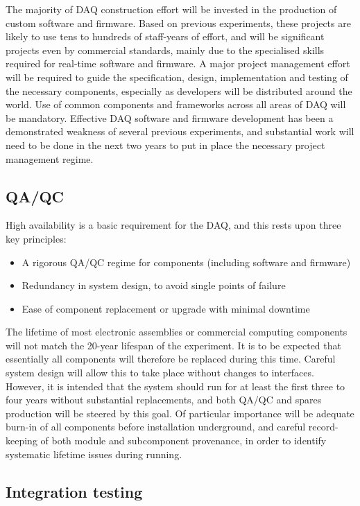 The majority of DAQ construction effort will be invested in the production of custom software and firmware. Based on previous experiments, these projects are likely to use tens to hundreds of staff-years of effort, and will be significant projects even by commercial standards, mainly due to the specialised skills required for real-time software and firmware. A major project management effort will be required to guide the specification, design, implementation and testing of the necessary components, especially as developers will be distributed around the world. Use of common components and frameworks across all areas of DAQ will be mandatory. Effective DAQ software and firmware development has been a demonstrated weakness of several previous experiments, and substantial work will need to be done in the next two years to put in place the necessary project management regime.

\subsection{QA/QC}

High availability is a basic requirement for the DAQ, and this rests upon three key principles:

\begin{itemize}
	\item A rigorous QA/QC regime for components (including software and firmware)
	\item Redundancy in system design, to avoid single points of failure
	\item Ease of component replacement or upgrade with minimal downtime
\end{itemize}

The lifetime of most electronic assemblies or commercial computing components will not match the 20-year lifespan of the experiment. It is to be expected that essentially all components will therefore be replaced during this time. Careful system design will allow this to take place without changes to interfaces. However, it is intended that the system should run for at least the first three to four years without substantial replacements, and both QA/QC and spares production will be steered by this goal. Of particular importance will be adequate burn-in of all components before installation underground, and careful record-keeping of both module and subcomponent provenance, in order to identify systematic lifetime issues during running.

\subsection{Integration testing}


